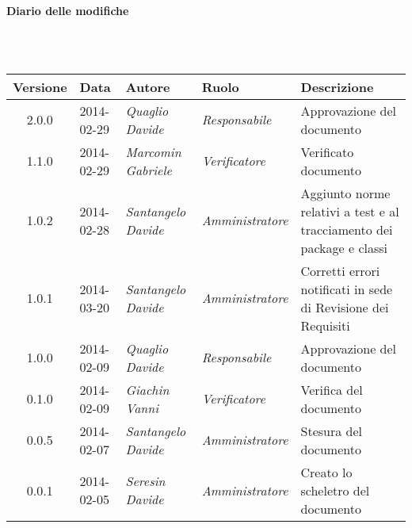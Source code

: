 \noindent\begin{Large}\textbf{Diario delle modifiche}\end{Large}\\
\\
\begin{small}
\begin{tabular}{|c|p{1.8cm}|p{2.8cm}|p{2.8cm}|p{3.5cm}|}
\hline
Versione & Data & Autore & Ruolo & Descrizione \\
\hline
2.0.0 & 2014-02-29 & 
\textit{Quaglio Davide} &
\textit{Responsabile} & Approvazione del documento\\
\hline
1.1.0 & 2014-02-29 & 
\textit{Marcomin Gabriele} &
\textit{Verificatore} & Verificato documento\\
\hline
1.0.2 & 2014-02-28 & 
\textit{Santangelo Davide} &
\textit{Amministratore} &  Aggiunto norme relativi a test e al tracciamento dei package e classi\\
\hline
1.0.1 & 2014-03-20 & 
\textit{Santangelo Davide} &
\textit{Amministratore} &  Corretti errori notificati in sede di Revisione dei Requisiti\\
\hline
1.0.0 & 2014-02-09 & 
\textit{Quaglio Davide} &
\textit{Responsabile} &  Approvazione del documento\\
\hline
0.1.0 & 2014-02-09 & 
\textit{Giachin Vanni} &
\textit{Verificatore} &  Verifica del documento\\
\hline
0.0.5 & 2014-02-07 & 
\textit{Santangelo Davide} &
\textit{Amministratore} &  Stesura del documento\\
\hline
0.0.1 & 2014-02-05 & 
\textit{Seresin Davide} &
\textit{Amministratore} &  Creato lo scheletro del documento\\
\hline
\end{tabular}\\
\end{small}
